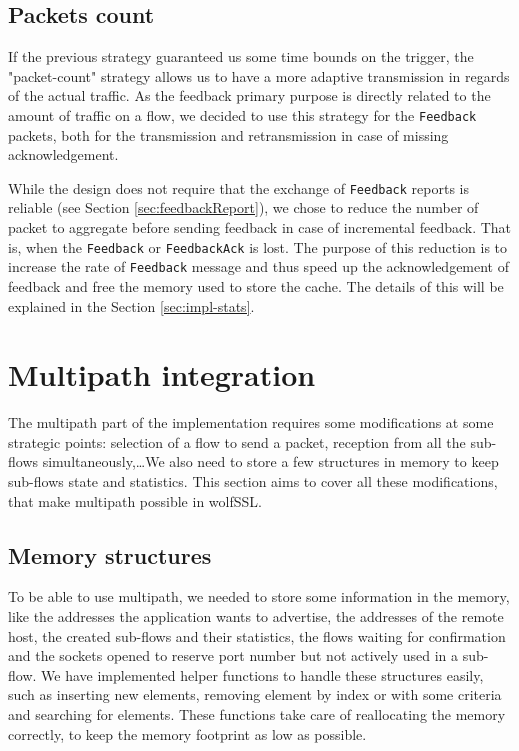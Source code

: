 \subsection{Packets count}

If the previous strategy guaranteed us some time bounds on the trigger, the "packet-count" strategy allows us to have a more adaptive transmission in regards of the actual traffic. As the feedback primary purpose is directly related to the amount of traffic on a flow, we decided to use this strategy for the \texttt{Feedback} packets, both for the transmission and retransmission in case of missing acknowledgement.

While the design does not require that the exchange of \texttt{Feedback} reports is reliable (see Section \ref{sec:feedbackReport}), we chose to reduce the number of packet to aggregate before sending feedback in case of incremental feedback. That is, when the \texttt{Feedback} or \texttt{FeedbackAck} is lost. The purpose of this reduction is to increase the rate of \texttt{Feedback} message and thus speed up the acknowledgement of feedback and free the memory used to store the cache. The details of this will be explained in the Section \ref{sec:impl-stats}.

\section{Multipath integration}

The multipath part of the implementation requires some modifications at some strategic points: selection of a flow to send a packet, reception from all the sub-flows simultaneously,\dots We also need to store a few structures in memory to keep sub-flows state and statistics. This section aims to cover all these modifications, that make multipath possible in wolfSSL.

\subsection{Memory structures}

To be able to use multipath, we needed to store some information in the memory, like the addresses the application wants to advertise, the addresses of the remote host, the created sub-flows and their statistics, the flows waiting for confirmation and the sockets opened to reserve port number but not actively used in a sub-flow. We have implemented helper functions to handle these structures easily, such as inserting new elements, removing element by index or with some criteria and searching for elements. These functions take care of reallocating the memory correctly, to keep the memory footprint as low as possible.

